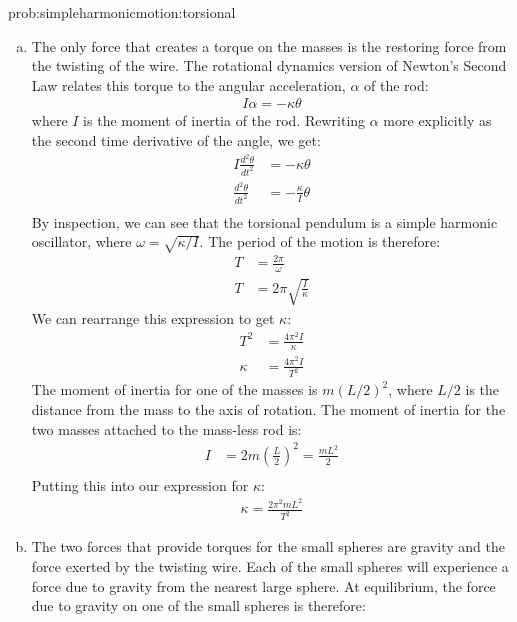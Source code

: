 \begin{solution}{prob:simpleharmonicmotion:torsional}\label{soln:simpleharmonicmotion:torsional}
\begin{enumerate}[(a)]
\item The only force that creates a torque on the masses is the restoring force from the twisting of the wire. The rotational dynamics version of Newton's Second Law relates this torque to the angular acceleration, $\alpha$ of the rod:
\begin{align*}
I\alpha=-\kappa\theta
\end{align*}
where $I$ is the moment of inertia of the rod. Rewriting $\alpha$ more explicitly as the second time derivative of the angle, we get:
\begin{align*}
I\frac{d^2\theta}{dt^2}&=-\kappa\theta\\
\frac{d^2\theta}{dt^2}&=-\frac{\kappa}{I}\theta\\
\end{align*}
By inspection, we can see that the torsional pendulum is a simple harmonic oscillator, where $\omega=\sqrt{\kappa/I}$. The period of the motion is therefore:
\begin{align*}
T&=\frac{2\pi}{\omega}\\
T&=2\pi\sqrt{\frac{I}{\kappa}}
\end{align*}
We can rearrange this expression to get $\kappa$:
\begin{align*}
T^2&=\frac{4\pi^2I}{\kappa}\\
\kappa&=\frac{4\pi^2I}{T^2}
\end{align*}
The moment of inertia for one of the masses is $m(L/2)^2$, where $L/2$ is the distance from the mass to the axis of rotation. The moment of inertia for the two masses attached to the mass-less rod is:
\begin{align*}
I&=2m\left(\frac{L}{2}\right)^2=\frac{mL^2}{2}\\
\end{align*}
Putting this into our expression for $\kappa$:
\begin{align*}
\kappa=\frac{2\pi^2mL^2}{T^2}
\end{align*}
\item The two forces that provide torques for the small spheres are gravity and the force exerted by the twisting wire. Each of the small spheres will experience a force due to gravity from the nearest large sphere. At equilibrium, the force due to gravity on one of the small spheres is therefore:
\begin{align*}

\end{align*}
\end{enumerate}
\end{solution}
